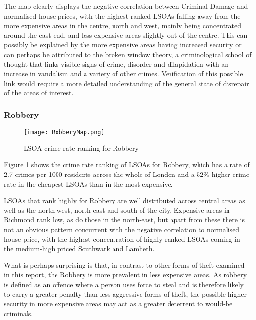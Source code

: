 \documentclass{article}
\begin{document}
The map clearly displays the negative correlation between Criminal Damage and normalised house prices, with the highest ranked LSOAs falling away from the more expensive areas in the centre, north and west, mainly being concentrated around the east end, and less expensive areas slightly out of the centre. This can possibly be explained by the more expensive areas having increased security or can perhaps be attributed to the broken window theory, a criminological school of thought that links visible signs of crime, disorder and dilapidation with an increase in vandalism and a variety of other crimes. Verification of this possible link would require a more detailed understanding of the general state of disrepair of the areas of interest.
\newline

\subsubsection{Robbery}
\begin{figure}[H]
\begin{center}
  \texttt{[image: RobberyMap.png]}
  \caption{LSOA crime rate ranking for Robbery}
  \label{fig:RobberyMap}
\end{center}
\end{figure}

Figure \ref{fig:RobberyMap} shows the crime rate ranking of LSOAs for Robbery, which has a rate of 2.7 crimes per 1000 residents across the whole of London and a 52\% higher crime rate in the cheapest LSOAs than in the most expensive.
\newline 

LSOAs that rank highly for Robbery are well distributed across central areas as well as the north-west, north-east and south of the city. Expensive areas in Richmond rank low, as do those in the north-east, but apart from these there is not an obvious pattern concurrent with the negative correlation to normalised house price, with the highest concentration of highly ranked LSOAs coming in the medium-high priced Southwark and Lambeth. 

What is perhaps surprising is that, in contrast to other forms of theft examined in this report, the Robbery is more prevalent in less expensive areas. As robbery is defined as an offence where a person uses force to steal and is therefore likely to carry a greater penalty than less aggressive forms of theft, the possible higher security in more expensive areas may act as a greater deterrent to would-be criminals.
\newline
\end{document}
